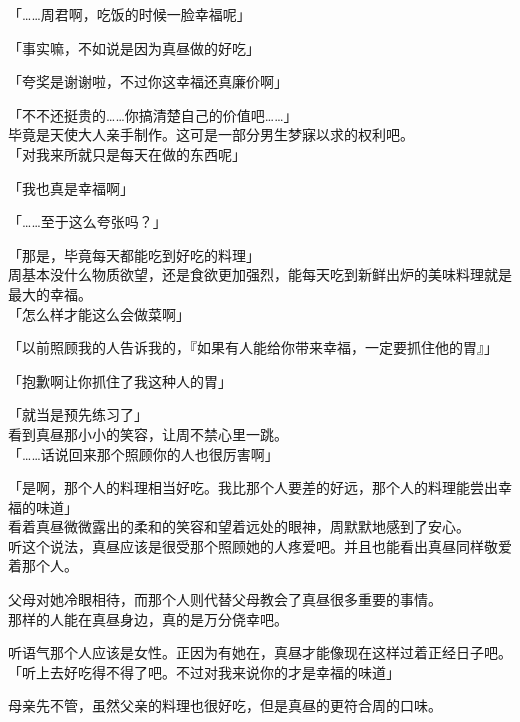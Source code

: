 「……周君啊，吃饭的时候一脸幸福呢」

「事实嘛，不如说是因为真昼做的好吃」

「夸奖是谢谢啦，不过你这幸福还真廉价啊」

「不不还挺贵的……你搞清楚自己的价值吧……」\\

毕竟是天使大人亲手制作。这可是一部分男生梦寐以求的权利吧。\\

「对我来所就只是每天在做的东西呢」

「我也真是幸福啊」

「……至于这么夸张吗？」

「那是，毕竟每天都能吃到好吃的料理」\\

周基本没什么物质欲望，还是食欲更加强烈，能每天吃到新鲜出炉的美味料理就是最大的幸福。\\

「怎么样才能这么会做菜啊」

「以前照顾我的人告诉我的，『如果有人能给你带来幸福，一定要抓住他的胃』」

「抱歉啊让你抓住了我这种人的胃」

「就当是预先练习了」\\

看到真昼那小小的笑容，让周不禁心里一跳。\\

「……话说回来那个照顾你的人也很厉害啊」

「是啊，那个人的料理相当好吃。我比那个人要差的好远，那个人的料理能尝出幸福的味道」\\

看着真昼微微露出的柔和的笑容和望着远处的眼神，周默默地感到了安心。\\

听这个说法，真昼应该是很受那个照顾她的人疼爱吧。并且也能看出真昼同样敬爱着那个人。

父母对她冷眼相待，而那个人则代替父母教会了真昼很多重要的事情。\\

那样的人能在真昼身边，真的是万分侥幸吧。

听语气那个人应该是女性。正因为有她在，真昼才能像现在这样过着正经日子吧。\\

「听上去好吃得不得了吧。不过对我来说你的才是幸福的味道」

母亲先不管，虽然父亲的料理也很好吃，但是真昼的更符合周的口味。\\

